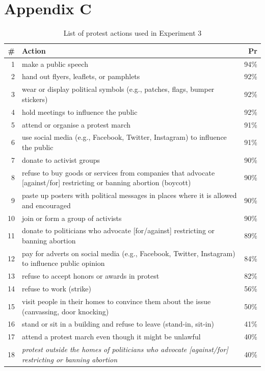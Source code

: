 \documentclass[12pt, letterpaper]{article}
\begin{document}
\begin{table}

\section{Appendix C}

\caption{List of protest actions used in Experiment 3}
\small
\begin{tabularx}{\linewidth}{rXr}
\addlinespace
\toprule
\# & Action & Pr\\
\midrule
1 & make a public speech & 94\%\\
2 & hand out flyers, leaflets, or pamphlets & 92\%\\
3 & wear or display political symbols (e.g., patches, flags, bumper stickers) & 92\%\\
4 & hold meetings to influence the public & 92\%\\
5 & attend or organise a protest march & 91\%\\
6 & use social media (e.g., Facebook, Twitter, Instagram) to influence the public & 91\%\\
7 & donate to activist groups & 90\%\\
8 & refuse to buy goods or services from companies that advocate [against/for] restricting or banning abortion (boycott) & 90\%\\
9 & paste up posters with political messages in places where it is allowed and encouraged & 90\%\\
10 & join or form a group of activists & 90\%\\
11 & donate to politicians who advocate [for/against] restricting or banning abortion & 89\%\\
12 & pay for adverts on social media (e.g., Facebook, Twitter, Instagram) to influence public opinion & 84\%\\
13 & refuse to accept honors or awards in protest & 82\%\\
14 & refuse to work (strike) & 56\%\\
15 & visit people in their homes to convince them about the issue (canvassing, door knocking) & 50\%\\
16 & stand or sit in a building and refuse to leave (stand-in, sit-in) & 41\%\\
17 & attend a protest march even though it might be unlawful & 40\%\\
18 & \textit{protest outside the homes of politicians who advocate [against/for] restricting or banning abortion} & 40\%\\

\end{tabularx}
\end{table}
\end{document}

